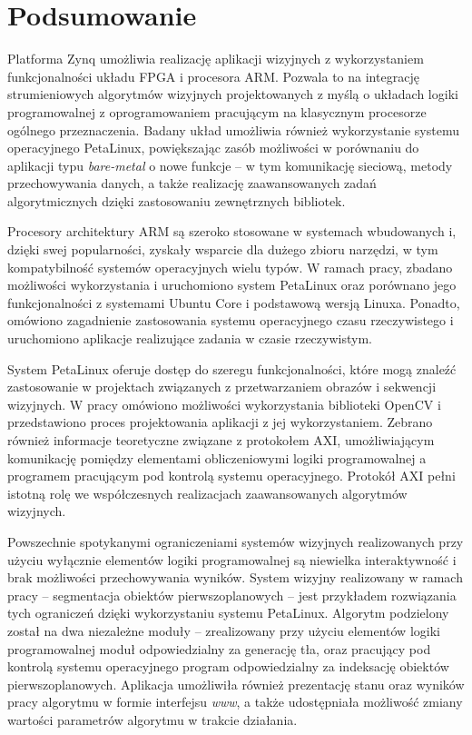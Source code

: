 \chapter{Podsumowanie}
\label{chap:summary}


Platforma Zynq umożliwia realizację aplikacji wizyjnych z wykorzystaniem funkcjonalności układu FPGA i procesora ARM. 
Pozwala to na integrację strumieniowych algorytmów wizyjnych projektowanych z myślą o układach logiki programowalnej z oprogramowaniem pracującym na klasycznym procesorze ogólnego przeznaczenia. 
Badany układ umożliwia również wykorzystanie systemu operacyjnego PetaLinux, powiększając zasób możliwości w porównaniu do aplikacji typu \emph{bare-metal} o nowe funkcje -- w tym komunikację sieciową, metody przechowywania danych, a także realizację zaawansowanych zadań algorytmicznych dzięki zastosowaniu zewnętrznych bibliotek. 

Procesory architektury ARM  są szeroko stosowane w systemach wbudowanych i, dzięki swej popularności, zyskały wsparcie dla dużego zbioru narzędzi, w tym kompatybilność systemów operacyjnych wielu typów. 
W ramach pracy, zbadano możliwości wykorzystania i uruchomiono system PetaLinux oraz porównano jego funkcjonalności z systemami Ubuntu Core i podstawową wersją Linuxa. 
Ponadto, omówiono zagadnienie zastosowania systemu operacyjnego czasu rzeczywistego i uruchomiono aplikacje realizujące zadania w czasie rzeczywistym.

System PetaLinux oferuje dostęp do szeregu funkcjonalności, które mogą znaleźć zastosowanie w projektach związanych z przetwarzaniem obrazów i sekwencji wizyjnych. 
W pracy omówiono możliwości wykorzystania biblioteki OpenCV i przedstawiono proces projektowania aplikacji z jej wykorzystaniem. 
Zebrano również informacje teoretyczne związane z protokołem AXI, umożliwiającym komunikację pomiędzy elementami obliczeniowymi logiki programowalnej a programem pracującym pod kontrolą systemu operacyjnego. 
Protokół AXI pełni istotną rolę we współczesnych realizacjach zaawansowanych algorytmów wizyjnych.

Powszechnie spotykanymi ograniczeniami systemów wizyjnych realizowanych przy użyciu wyłącznie elementów logiki programowalnej są niewielka interaktywność i brak możliwości przechowywania wyników. 
System wizyjny realizowany w ramach pracy -- segmentacja obiektów pierwszoplanowych -- jest przykładem rozwiązania tych ograniczeń dzięki wykorzystaniu systemu PetaLinux. 
Algorytm podzielony został na dwa niezależne moduły -- zrealizowany przy użyciu elementów logiki programowalnej moduł odpowiedzialny za generację tła, oraz pracujący pod kontrolą systemu operacyjnego program odpowiedzialny za indeksację obiektów pierwszoplanowych. 
Aplikacja umożliwiła również prezentację stanu oraz wyników pracy algorytmu w formie interfejsu \emph{www}, a także udostępniała możliwość zmiany wartości parametrów algorytmu w trakcie działania.

